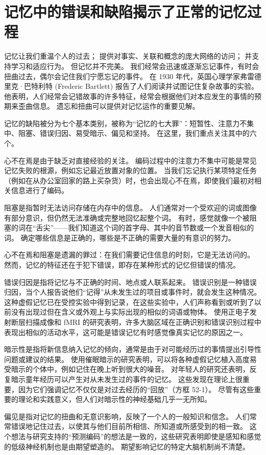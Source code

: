 \section{记忆中的错误和缺陷揭示了正常的记忆过程}
记忆让我们重温个人的过去； 提供对事实、关联和概念的庞大网络的访问； 并支持学习和适应行为。 但记忆并不完美。 我们经常会迅速或逐渐忘记事件，有时会扭曲过去，偶尔会记住我们宁愿忘记的事件。 在 1930 年代，英国心理学家弗雷德里克·巴特利特 (Frederic Bartlett) 报告了人们阅读并试图记住复杂故事的实验。 他表明，人们经常会记错故事的许多特征，经常会根据他们对本应发生的事情的预期来歪曲信息。 遗忘和扭曲可以提供对记忆运作的重要见解。

记忆的缺陷被分为七个基本类别，被称为“记忆的七大罪”：短暂性、注意力不集中、阻塞、错误归因、易受暗示、偏见和坚持。 在这里，我们重点关注其中的六个。

心不在焉是由于缺乏对直接经验的关注。 编码过程中的注意力不集中可能是常见记忆失败的根源，例如忘记最近放置对象的位置。 当我们忘记执行某项特定任务（例如在从办公室回家的路上买杂货）时，也会出现心不在焉，即使我们最初对相关信息进行了编码。

阻塞是指暂时无法访问存储在内存中的信息。 人们通常对一个受欢迎的词或图像有部分意识，但仍然无法准确或完整地回忆起整个词。 有时，感觉就像一个被阻塞的词在“舌尖”——我们知道这个词的首字母、其中的音节数或一个发音相似的词。 确定哪些信息是正确的，哪些是不正确的需要大量的有意识的努力。

心不在焉和阻塞是遗漏的罪过：在我们需要记住信息的时刻，它是无法访问的。 然而，记忆的特征还在于犯下错误，即存在某种形式的记忆但错误的情况。

错误归因是指将记忆与不正确的时间、地点或人联系起来。 错误识别是一种错误归因，当个人报告说他们“记得”从未发生过的项目或事件时，就会发生这种情况。 这种虚假记忆已在受控实验中得到记录，在这些实验中，人们声称看到或听到了以前没有出现过但在含义或外观上与实际出现的相似的词语或物体。 使用正电子发射断层扫描成像和 fMRI 的研究表明，许多大脑区域在正确识别和错误识别过程中表现出相似的活动水平，这可能是错误记忆有时感觉像真实记忆的原因之一。

暗示性是指将新信息纳入记忆的倾向，通常是由于对可能经历过的事情提出引导性问题或建议的结果。 使用催眠暗示的研究表明，可以将各种虚假记忆植入高度易受暗示的个体中，例如记住在晚上听到很大的噪音。 对年轻人的研究还表明，反复暗示童年经历可以产生对从未发生过的事件的记忆。 这些发现在理论上很重要，因为它们强调记忆不仅仅是对过去经历的“回放”（方框 52-1）。 尽管有这些重要的理论和实践意义，但人们对暗示性的神经基础几乎一无所知。

偏见是指对记忆的扭曲和无意识影响，反映了一个人的一般知识和信念。 人们常常错误地记住过去，以使其与他们目前所相信、所知道或所感受到的相一致。 这个想法与研究支持的“预测编码”的想法是一致的，这些研究表明即使是感知和感觉的低级神经机制也是由期望塑造的。 期望影响记忆的特定大脑机制尚不清楚。

